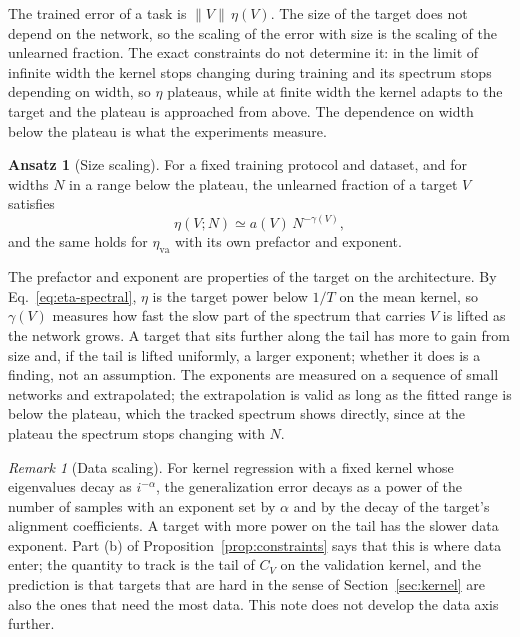 \documentclass[11pt]{article}
\theoremstyle{definition}
\newtheorem{ansatz}{Ansatz}
\theoremstyle{remark}
\newtheorem*{remark}{Remark}
\newcommand{\va}{\mathrm{va}}
\begin{document}
The trained error of a task is $\|V\|\,\eta(V)$.
The size of the target does not depend on the network, so the scaling of the error with size is the scaling of the unlearned fraction.
The exact constraints do not determine it: in the limit of infinite width the kernel stops changing during training and its spectrum stops depending on width, so $\eta$ plateaus, while at finite width the kernel adapts to the target and the plateau is approached from above.
The dependence on width below the plateau is what the experiments measure.

\begin{ansatz}[Size scaling]\label{ans:size}
For a fixed training protocol and dataset, and for widths $N$ in a range below the plateau, the unlearned fraction of a target $V$ satisfies
\begin{equation}\label{eq:ansatz}
\eta(V; N) \simeq a(V)\,N^{-\gamma(V)} ,
\end{equation}
and the same holds for $\eta_\va$ with its own prefactor and exponent.
\end{ansatz}

The prefactor and exponent are properties of the target on the architecture.
By Eq.~\eqref{eq:eta-spectral}, $\eta$ is the target power below $1/T$ on the mean kernel, so $\gamma(V)$ measures how fast the slow part of the spectrum that carries $V$ is lifted as the network grows.
A target that sits further along the tail has more to gain from size and, if the tail is lifted uniformly, a larger exponent; whether it does is a finding, not an assumption.
The exponents are measured on a sequence of small networks and extrapolated; the extrapolation is valid as long as the fitted range is below the plateau, which the tracked spectrum shows directly, since at the plateau the spectrum stops changing with $N$.

\begin{remark}[Data scaling]
For kernel regression with a fixed kernel whose eigenvalues decay as $i^{-\alpha}$, the generalization error decays as a power of the number of samples with an exponent set by $\alpha$ and by the decay of the target's alignment coefficients.
A target with more power on the tail has the slower data exponent.
Part (b) of Proposition~\ref{prop:constraints} says that this is where data enter; the quantity to track is the tail of $C_V$ on the validation kernel, and the prediction is that targets that are hard in the sense of Section~\ref{sec:kernel} are also the ones that need the most data.
This note does not develop the data axis further.
\end{remark}
\end{document}
